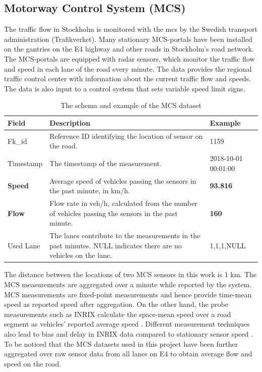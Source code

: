 \documentclass[english]{kththesis}
\begin{document}
\subsection{Motorway Control System (MCS)}
\label{subsec:mcs}
The traffic flow in Stockholm is monitored with the \acrfull{mcs} by the Swedish transport administration (Trafikverket). Many stationary MCS-portals have been installed on the gantries on the E4 highway and other roads in Stockholm's road network. The MCS-portals are equipped with radar sensors, which monitor the traffic flow and speed in each lane of the road every minute. The data provides the regional traffic control center with information about the current traffic flow and speeds. The data is also input to a control system that sets variable speed limit signs.

\begin{table}[!h]
\begin{tabular}{@{}m{} m{} m{}@{}}
\toprule
\textbf{Field} & \textbf{Description} & \textbf{Example} \\
\midrule
Fk\_id & Reference ID identifying the location of sensor on the road. & 1159 \\ 
\midrule
Timestamp & The timestamp of the measurement. & 2018-10-01 00:01:00 \\ 
\midrule
\textbf{Speed} & Average speed of vehicles passing the sensors in the past minute, in km/h. & \textbf{93.816} \\ 
\midrule
\textbf{Flow} & Flow rate in veh/h, calculated from the   number of vehicles passing the sensors in the past minute. & \textbf{160} \\ \midrule
Used Lane & The lanes contribute to the measurements in the past minutes. NULL indicates there are no vehicles on the lane. & 1,1,1,NULL \\ 
\bottomrule
\end{tabular}
    \caption{The schema and example of the MCS dataset}
    \label{tab:mcs_schema}
\end{table}

The distance between the locations of two MCS sensors in this work is 1 km. The MCS measurements are aggregated over a minute while reported by the system. MCS measurements are fixed-point measurements and hence provide time-mean speed as reported speed after aggregation. On the other hand, the probe measurements such as INRIX calculate the space-mean speed over a road segment as vehicles' reported average speed  \cite{sharma_inrix_data_opportunity}. Different measurement techniques also lead to bias and delay in INRIX data compared to stationary sensor speed \cite{sharma_inrix_data_opportunity, kim_inrix_data_comparing}. To be noticed that the MCS datasets used in this project have been further aggregated over raw sensor data from all lanes on E4 to obtain average flow and speed on the road.
\end{document}

